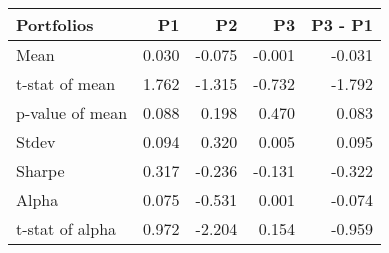 \begin{tabular}{lrrrr}
\toprule
Portfolios & P1 & P2 & P3 & P3 - P1 \\
\midrule
Mean & 0.030 & -0.075 & -0.001 & -0.031 \\
t-stat of mean & 1.762 & -1.315 & -0.732 & -1.792 \\
p-value of mean & 0.088 & 0.198 & 0.470 & 0.083 \\
Stdev & 0.094 & 0.320 & 0.005 & 0.095 \\
Sharpe & 0.317 & -0.236 & -0.131 & -0.322 \\
Alpha & 0.075 & -0.531 & 0.001 & -0.074 \\
t-stat of alpha & 0.972 & -2.204 & 0.154 & -0.959 \\
\bottomrule
\end{tabular}
